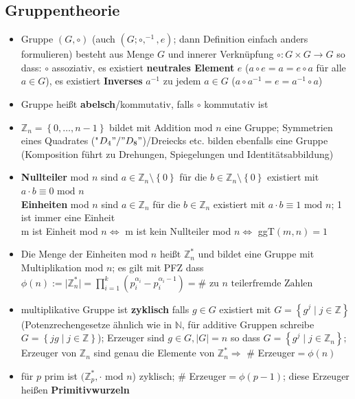 \documentclass[10pt,a4paper]{article}
\begin{document}
\subsection{Gruppentheorie}
\begin{itemize}
\item Gruppe $(G,\circ)$ (auch $(G;\circ,^{-1},e)$; dann Definition einfach anders formulieren) besteht aus Menge $G$ und innerer Verknüpfung $\circ:G\times G\rightarrow G$ so dass: $\circ$ assoziativ, es existiert  \textbf{neutrales Element} $e$ ($a\circ e=a=e\circ a$ für alle $a\in G$), es existiert \textbf{Inverses} $a^{-1}$ zu jedem $a\in G$ ($a\circ a^{-1}=e=a^{-1}\circ a$)
\item Gruppe heißt \textbf{abelsch}/kommutativ, falls $\circ$ kommutativ ist
\item $\mathbb{Z}_{n}=\left\lbrace 0,\dotsc,n-1\right\rbrace $ bildet mit Addition mod $n$ eine Gruppe; Symmetrien eines Quadrates ("$D_4"/"D_{8}"$)/Dreiecks etc. bilden ebenfalls eine Gruppe (Komposition führt zu Drehungen, Spiegelungen und Identitätsabbildung)
\item \textbf{Nullteiler} mod $n$ sind $a\in \mathbb{Z}_{n}\setminus \left\lbrace 0\right\rbrace$ für die $b\in \mathbb{Z}_{n}\setminus \left\lbrace 0\right\rbrace$ existiert mit $a\cdot b\equiv 0 \text{ mod } n$\\
\textbf{Einheiten} mod $n$ sind $a\in \mathbb{Z}_{n}$ für die $b\in \mathbb{Z}_{n}$ existiert mit $a\cdot b\equiv 1 \text{ mod } n$; 1 ist immer eine Einheit\\
m ist Einheit mod $n\Leftrightarrow$ m ist kein Nullteiler mod $n\Leftrightarrow$ ggT$(m,n)=1$
\item Die Menge der Einheiten mod $n$ heißt $\mathbb{Z}_{n}^{*}$ und bildet eine Gruppe mit Multiplikation mod $n$; es gilt mit PFZ dass $\phi(n):=\vert \mathbb{Z}_{n}^{*}\vert=\prod_{i=1}^{k}(p_{i}^{\alpha_{i}}-p_{i}^{\alpha_{i}-1})=\# \text{ zu } n \text{ teilerfremde Zahlen}$
\item multiplikative Gruppe ist \textbf{zyklisch} falls $g\in G$ existiert mit $G=\left\lbrace g^{j}\mid j \in \mathbb{Z}\right\rbrace$ (Potenzrechengesetze ähnlich wie in $\mathbb{N}$, für additive Gruppen schreibe $G=\left\lbrace jg\mid j \in \mathbb{Z}\right\rbrace$); Erzeuger sind $g\in G,\vert G\vert =n$ so dass $G=\left\lbrace g^{j}\mid j \in \mathbb{Z}_{n}\right\rbrace;$\\
Erzeuger von $\mathbb{Z}_{n}$ sind genau die Elemente von $\mathbb{Z}_{n}^{*}\Rightarrow$ \# Erzeuger$=\phi(n)$ 
\item für $p$ prim ist $(\mathbb{Z}_{p}^{*}, \cdot \text{ mod } n$) zyklisch; \# Erzeuger$=\phi(p-1)$; diese Erzeuger heißen \textbf{Primitivwurzeln}

\end{itemize}
\end{document}
